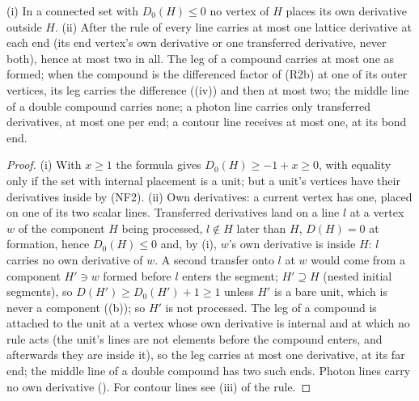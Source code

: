 \begin{corollary}\label{rot:h1s:nd}
\textup{(i)} In a connected set with $D_0(H)\le0$ no vertex of $H$ places its own derivative outside $H$. \textup{(ii)} After the rule of  every line carries at most one lattice derivative at each end (its end vertex's own derivative or one transferred derivative, never both), hence at most two in all. The leg of a compound carries at most one as formed; when the compound is the differenced factor of (R2b) at one of its outer vertices, its leg carries the difference ((iv)) and then at most two; the middle line of a double compound carries none; a photon line carries only transferred derivatives, at most one per end; a contour line receives at most one, at its bond end.
\end{corollary}
\begin{proof}
(i) With $x\ge1$ the formula gives $D_0(H)\ge-1+x\ge0$, with equality only if the set with internal placement is a unit; but a unit's vertices have their derivatives inside by (NF2). (ii) Own derivatives: a current vertex has one, placed on one of its two scalar lines. Transferred derivatives land on a line $l$ at a vertex $w$ of the component $H$ being processed, $l\notin H$ later than $H$, $D(H)=0$ at formation, hence $D_0(H)\le0$ and, by (i), $w$'s own derivative is inside $H$: $l$ carries no own derivative of $w$. A second transfer onto $l$ at $w$ would come from a component $H'\ni w$ formed before $l$ enters the segment; $H'\supseteq H$ (nested initial segments), so $D(H')\ge D_0(H')+1\ge1$ unless $H'$ is a bare unit, which is never a component ((b)); so $H'$ is not processed. The leg of a compound is attached to the unit at a vertex whose own derivative is internal and at which no rule acts (the unit's lines are not elements before the compound enters, and afterwards they are inside it), so the leg carries at most one derivative, at its far end; the middle line of a double compound has two such ends. Photon lines carry no own derivative (). For contour lines see (iii) of the rule.
\end{proof}

